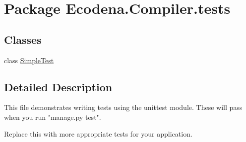 \hypertarget{namespace_ecodena_1_1_compiler_1_1tests}{
\section{Package Ecodena.Compiler.tests}
\label{d2/de6/namespace_ecodena_1_1_compiler_1_1tests}
}
\subsection*{Classes}
\begin{DoxyCompactItemize}
\item 
class \hyperlink{class_ecodena_1_1_compiler_1_1tests_1_1_simple_test}{SimpleTest}
\end{DoxyCompactItemize}


\subsection{Detailed Description}
\begin{DoxyVerb}
This file demonstrates writing tests using the unittest module. These will pass
when you run "manage.py test".

Replace this with more appropriate tests for your application.
\end{DoxyVerb}
 